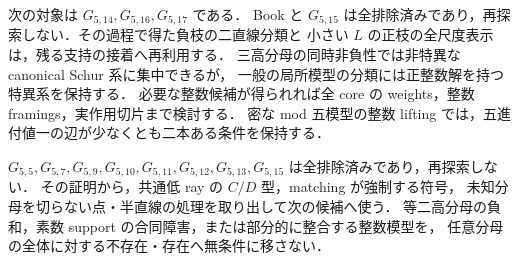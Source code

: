 次の対象は $G_{5,14},G_{5,16},G_{5,17}$ である．
Book と $G_{5,15}$ は全排除済みであり，再探索しない．その過程で得た負枝の二直線分類と
小さい $L$ の正枝の全尺度表示は，残る支持の接着へ再利用する．
三高分母の同時非負性では非特異な canonical Schur 系に集中できるが，
一般の局所模型の分類には正整数解を持つ特異系を保持する．
必要な整数候補が得られれば全 core の weights，整数 framings，実作用切片まで検討する．
密な mod 五模型の整数 lifting では，五進付値一の辺が少なくとも二本ある条件を保持する．

$G_{5,5},G_{5,7},G_{5,9},G_{5,10},G_{5,11},G_{5,12},G_{5,13},G_{5,15}$ は全排除済みであり，再探索しない．
その証明から，共通低 ray の $C/D$ 型，matching が強制する符号，
未知分母を切らない点・半直線の処理を取り出して次の候補へ使う．
等二高分母の負和，素数 support の合同障害，または部分的に整合する整数模型を，
任意分母の全体に対する不存在・存在へ無条件に移さない．
